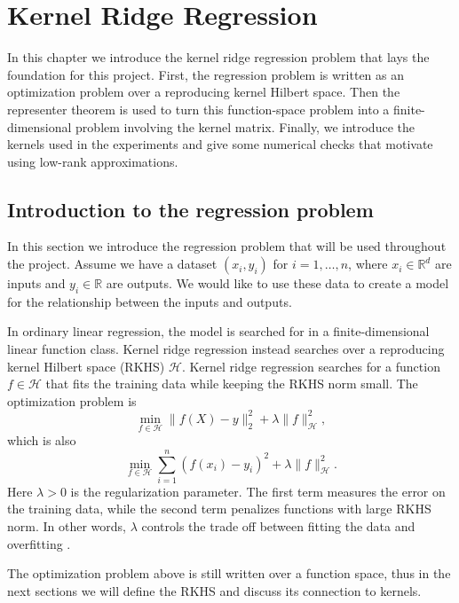 \chapter{Kernel Ridge Regression}

In this chapter we introduce the kernel ridge regression problem that lays the foundation for this project. First, the regression problem is written as an optimization problem over a reproducing kernel Hilbert space. Then the representer theorem is used to turn this function-space problem into a finite-dimensional problem involving the kernel matrix. Finally, we introduce the kernels used in the experiments and give some numerical checks that motivate using low-rank approximations.

\section{Introduction to the regression problem}

In this section we introduce the regression problem that will be used throughout the project. Assume we have a dataset $(x_i,y_i)$ for $i=1,\ldots,n$, where $x_i\in\mathbb{R}^d$ are inputs and $y_i\in\mathbb{R}$ are outputs. We would like to use these data to create a model for the relationship between the inputs and outputs.

In ordinary linear regression, the model is searched for in a finite-dimensional linear function class. Kernel ridge regression instead searches over a reproducing kernel Hilbert space (RKHS) $\mathcal H$. Kernel ridge regression searches for a function $f\in\mathcal H$ that fits the training data while keeping the RKHS norm small. The optimization problem is
\[
\min_{f\in\mathcal{H}}\|f(X)-y\|_2^2+\lambda\|f\|_{\mathcal{H}}^2,
\]
which is also
\[
\min_{f\in\mathcal{H}}\sum_{i=1}^n(f(x_i)-y_i)^2+\lambda\|f\|_{\mathcal{H}}^2.
\]
Here $\lambda>0$ is the regularization parameter. The first term measures the error on the training data, while the second term penalizes functions with large RKHS norm. In other words, $\lambda$ controls the trade off between fitting the data and overfitting \citep{saunders1998ridge,hofmann2008kernel}.

The optimization problem above is still written over a function space, thus in the next sections we will define the RKHS and discuss its connection to kernels.

